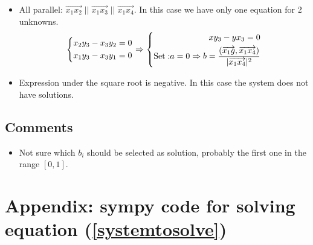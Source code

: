 \documentclass{article}
\begin{document}
\begin{landscape}
\begin{itemize}
        \item All parallel: $\overrightarrow{x_1x_2}\; ||\; \overrightarrow{x_1x_3} \;||\; \overrightarrow{x_1x_4}$. 
        In this case we have only one equation for 2 unknowns.
        \begin{equation}
            \left\{
            \begin{aligned}
                & x_2 y_3 - x_3 y_2 = 0 \\
                & x_1 y_3 - x_3 y_1 = 0 \\
            \end{aligned}
            \right.
            \Rightarrow
            \left\{
            \begin{aligned}
                x y_3 - y x_3 = 0\\
                {\rm Set: } a=0 \Rightarrow b=\frac{\left(\overrightarrow{x_1g},\overrightarrow{x_1x_4}\right)}{|\overrightarrow{x_1x_4}|^2} \\
            \end{aligned}
            \right.
        \end{equation}

        \item Expression under the square root is negative. In this case the system does not have solutions.

    \end{itemize}

    \subsection*{Comments}
    \begin{itemize}
        \item Not sure which $b_i$ should be selected as solution, probably the first one in the range $[0, 1]$.
    \end{itemize}



    \section*{Appendix: sympy code for solving equation (\ref{systemtosolve})}
    \inputminted{python}{main.py}
   


\end{landscape}
\end{document}
